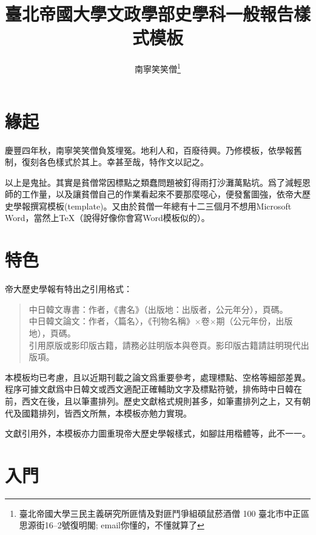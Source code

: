 \title{臺北帝國大學文政學部史學科一般報告樣式模板}
\author{南寧笑笑僧\footnote{\ttfamily 臺北帝國大學三民主義硏究所匪情及對匪鬥爭組碩鼠菸酒僧\newline
  \hspace*{4ex}100 臺北市中正區思源街16--2號復明閣; email你懂的，不懂就算了}}



\maketitle

\section*{緣起}

慶豐四年秋，南寧笑笑僧負笈埋冤。地利人和，百廢待興。乃修模板，依學報舊制，復刻各色樣式於其上。幸甚至哉，特作文以記之。

以上是鬼扯。其實是貧僧常因標點之類蠢問題被釘得雨打沙灘萬點坑。爲了減輕恩師的工作量，以及讓貧僧自己的作業看起來不要那麼噁心，便發奮圖強，依帝大歷史學報撰寫模板(template)。又由於貧僧一年總有十二三個月不想用Microsoft Word，當然上\TeX（說得好像你會寫Word模板似的）。

\section*{特色}

帝大歷史學報有特出之引用格式：
\begin{quote}
中日韓文專書：作者，《書名》（出版地：出版者，公元年分），頁碼。\\
中日韓文論文：作者，〈篇名〉，《刊物名稱》×卷×期（公元年份，出版地），頁碼。\\
引用原版或影印版古籍，請務必註明版本與卷頁。影印版古籍請註明現代出版項。
\end{quote}
本模板均已考慮，且以近期刊載之論文爲重要參考，處理標點、空格等細部差異。程序可據文獻爲中日韓文或西文適配正確輔助文字及標點符號，排佈時中日韓在前，西文在後，且以筆畫排列。歷史文獻格式規則甚多，如筆畫排列之上，又有朝代及國籍排列，皆西文所無，本模板亦勉力實現。

文獻引用外，本模板亦力圖重現帝大歷史學報樣式，如腳註用楷體等，此不一一。

\section*{入門}

